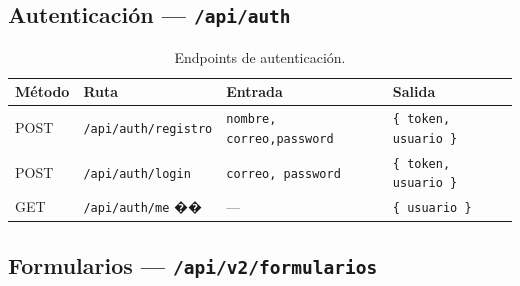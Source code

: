 \documentclass[12pt,a4paper]{article}
\begin{document}
\subsection{Autenticación — \texttt{/api/auth}}

\begin{table}[H]
\centering
\renewcommand{\arraystretch}{1.5}
\begin{tabular}{p{1.2cm} p{4cm} p{4.5cm} p{4.5cm}}
\toprule
\textbf{Método} & \textbf{Ruta} & \textbf{Entrada} & \textbf{Salida} \\
\midrule
POST & \texttt{/api/auth/registro} &
  \texttt{nombre, correo,}\newline\texttt{password} &
  \texttt{\{ token, usuario \}} \\
\midrule
POST & \texttt{/api/auth/login} &
  \texttt{correo, password} &
  \texttt{\{ token, usuario \}} \\
\midrule
GET  & \texttt{/api/auth/me} �� &
  — &
  \texttt{\{ usuario \}} \\
\bottomrule
\end{tabular}
\caption{Endpoints de autenticación.}
\end{table}

\subsection{Formularios — \texttt{/api/v2/formularios}}
\end{document}
